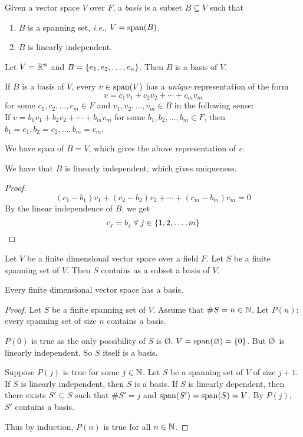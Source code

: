 \begin{defn}[Basis] \label{defn:basis}
    Given a vector space $V$ over $F$, a \emph{basis} is a subset $B \subseteq V$ such that
    \begin{enumerate}[label=(\alph*)]
        \item $B$ is a spanning set, \textit{i.e.}, $V = \operatorname{span}(B)$.
        \item $B$ is linearly independent.
    \end{enumerate}
\end{defn}
\begin{example}
    Let $V = \mathbb{R}^{n}$ and $B = \set{e_{1}, e_{2}, \dots, e_{n}}$. Then $B$ is a basis of $V$.
\end{example}
\begin{rem}
    If $B$ is a basis of $V$, every $v \in \operatorname{span}(V)$ has a \emph{unique} representation of the form \[
        v = c_{1} v_{1} + c_{2} v_{2} + \cdots + c_{m} v_{m}
    \] for some $c_{1}, c_{2}, \dots, c_{m} \in F$ and $v_{1}, v_{2}, \dots, v_{m} \in B$ in the following sense: \\
    If $v = b_{1} v_{1} + b_{2} v_{2} + \cdots + b_{m} v_{m}$ for some $b_{1}, b_{2}, \dots, b_{m} \in F$, then $b_{1} = c_{1}, b_{2} = c_{2}, \dots, b_{m} = c_{m}$.

    We have span of $B = V$, which gives the above representation of $v$.

    We have that $B$ is linearly independent, which gives uniqueness.
    \begin{proof}
        \[
            (c_{1} - b_{1}) v_{1} + (c_{2} - b_{2}) v_{2} + \cdots + (c_{m} - b_{m}) v_{m} = 0
        \] By the linear independence of $B$, we get \[
            c_{j} = b_{j} \;\forall\; j \in \set{1, 2, \dots, m} \qedhere
        \]
    \end{proof}
\end{rem}

\begin{cor}[] \label{cor:}
    Let $V$ be a finite dimensional vector space over a field $F$.
    Let $S$ be a finite spanning set of $V$.
    Then $S$ contains as a subset a basis of $V$.
\end{cor}
\begin{cor}[] \label{cor:}
    Every finite dimensional vector space has a basis.
\end{cor}
\begin{proof}
    Let $S$ be a finite spanning set of $V$.
    Assume that $\#S = n \in \mathbb{N}$.
    Let $P(n)$: every spanning set of size $n$ contains a basis.

    $P(0)$ is true as the only possibility of $S$ is \O.
    $V = \operatorname{span}(\varnothing) = \{0\}$. But \O\ is linearly independent. So $S$ itself is a basis.

    Suppose $P(j)$ is true for some $j \in \mathbb{N}$.
    Let $S$ be a spanning set of $V$ of size $j + 1$.
    If $S$ is linearly independent, then $S$ is a basis.
    If $S$ is linearly dependent, then there exists $S' \subseteq S$ such that $\#S' = j$ and $\operatorname{span}(S') = \operatorname{span}(S) = V$.
    By $P(j)$, $S'$ contains a basis.

    Thus by induction, $P(n)$ is true for all $n \in \mathbb{N}$.
\end{proof}

